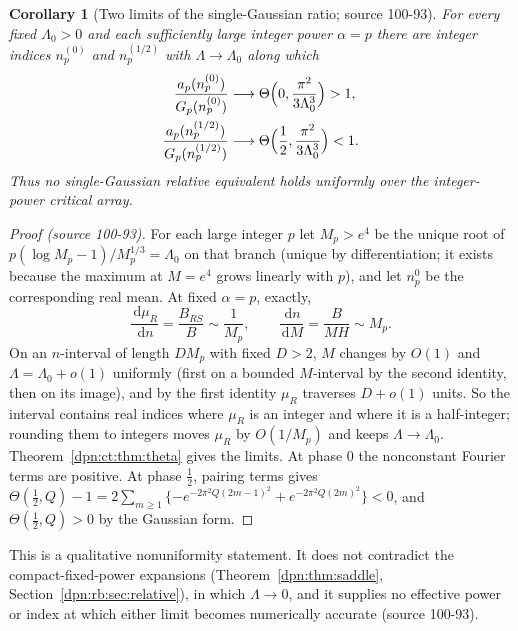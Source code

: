 \documentclass[11pt]{article}
\numberwithin{equation}{section}
\newtheorem{corollary}[theorem]{Corollary}
\theoremstyle{definition}\newtheorem{definition}[theorem]{Definition}
\theoremstyle{remark}\newtheorem{remark}[theorem]{Remark}
\newcommand{\dd}{\,\mathrm d}\newcommand{\ii}{\mathrm i}
\newcommand{\src}[1]{\textup{(source #1)}}
\begin{document}
\begin{corollary}[Two limits of the single-Gaussian ratio; source 100-93]\label{dpn:ct:cor:obstruction}
For every fixed $\Lambda_0>0$ and each sufficiently large integer power
$\alpha=p$ there are integer indices $n^{(0)}_p$ and $n^{(1/2)}_p$ with
$\Lambda\to\Lambda_0$ along which
\begin{align}
 \frac{a_p(n^{(0)}_p)}{G_p(n^{(0)}_p)}&\longrightarrow
 \Theta\Bigl(0,\frac{\pi^2}{3\Lambda_0^3}\Bigr)>1,\label{dpn:ct:eq:phasezero}\\
 \frac{a_p(n^{(1/2)}_p)}{G_p(n^{(1/2)}_p)}&\longrightarrow
 \Theta\Bigl(\frac12,\frac{\pi^2}{3\Lambda_0^3}\Bigr)<1.\label{dpn:ct:eq:phasehalf}
\end{align}
Thus no single-Gaussian relative equivalent holds uniformly over the
integer-power critical array.
\end{corollary}
\begin{proof}[Proof \src{100-93}]
For each large integer $p$ let $M_p>e^4$ be the unique root of
$p(\log M_p-1)/M_p^{1/3}=\Lambda_0$ on that branch (unique by differentiation;
it exists because the maximum at $M=e^4$ grows linearly with $p$), and let
$n^0_p$ be the corresponding real mean.  At fixed $\alpha=p$, exactly,
\begin{equation}\label{dpn:ct:eq:phasederivatives}
 \frac{\dd\mu_R}{\dd n}=\frac{B_{RS}}B\sim\frac1{M_p},\qquad
 \frac{\dd n}{\dd M}=\frac B{MH}\sim M_p.
\end{equation}
On an $n$-interval of length $DM_p$ with fixed $D>2$, $M$ changes by $O(1)$ and
$\Lambda=\Lambda_0+o(1)$ uniformly (first on a bounded $M$-interval by the
second identity, then on its image), and by the first identity $\mu_R$
traverses $D+o(1)$ units.  So the interval contains real indices where $\mu_R$
is an integer and where it is a half-integer; rounding them to integers moves
$\mu_R$ by $O(1/M_p)$ and keeps $\Lambda\to\Lambda_0$.
Theorem~\ref{dpn:ct:thm:theta} gives the limits.  At phase $0$ the nonconstant
Fourier terms are positive.  At phase $\frac12$, pairing terms gives
$\Theta(\frac12,Q)-1=2\sum_{m\ge1}\{-e^{-2\pi^2Q(2m-1)^2}+e^{-2\pi^2Q(2m)^2}\}<0$,
and $\Theta(\frac12,Q)>0$ by the Gaussian form.
\end{proof}
This is a qualitative nonuniformity statement.  It does not contradict the
compact-fixed-power expansions (Theorem~\ref{dpn:thm:saddle},
Section~\ref{dpn:rb:sec:relative}), in which $\Lambda\to0$, and it supplies no
effective power or index at which either limit becomes numerically accurate
\src{100-93}.
\end{document}
